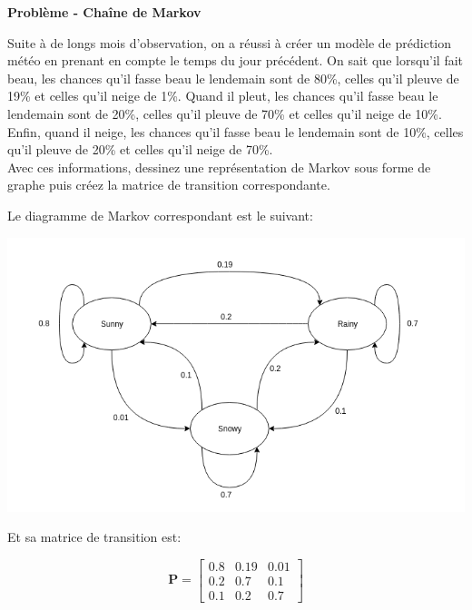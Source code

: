 \begin{Exercice}[10 minutes]\textbf{Problème - Chaîne de Markov}

Suite à  de longs mois d’observation, on a réussi à créer un modèle de prédiction météo en prenant en compte le temps du jour précédent. On sait que lorsqu’il fait beau, les chances qu’il fasse beau le lendemain sont de 80\%, celles qu’il pleuve de 19\% et celles qu’il neige de 1\%. Quand il pleut, les chances qu’il fasse beau le lendemain sont de 20\%, celles qu’il pleuve de 70\% et celles qu’il neige de 10\%. Enfin, quand il neige, les chances qu’il fasse beau le lendemain sont de 10\%, celles qu’il pleuve de 20\% et celles qu’il neige de 70\%.\\
Avec ces informations, dessinez une représentation de Markov sous forme de graphe puis créez la matrice de transition correspondante.


    \begin{solution}
        Le diagramme de Markov correspondant est le suivant:

	    \centering
	    \includegraphics[width=.7\textwidth]{solutions/Etats_markov.png}
	
	Et sa matrice de transition est:

	\[ 
		\mathbf{P} =
		\begin{bmatrix}
		0.8 & 0.19 & 0.01 \\
		0.2 & 0.7 & 0.1 \\
		0.1 & 0.2 & 0.7
		\end{bmatrix}
	\]
	
    \end{solution}


\end{Exercice}


